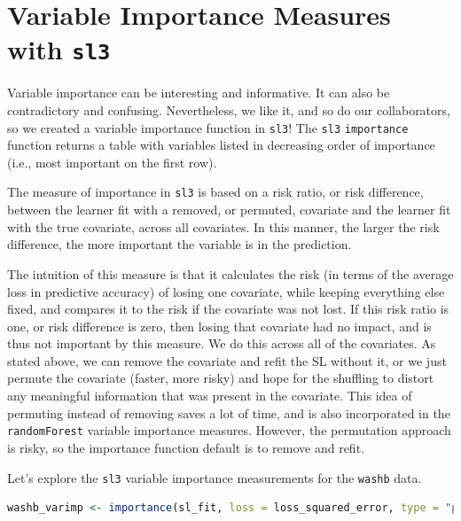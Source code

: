 \documentclass[12pt, krantz2,]{krantz}
\newcommand{\passthrough}[1]{#1}
\theoremstyle{definition}
\theoremstyle{definition}
\theoremstyle{definition}
\newcommand{\1}{\mathbbm{1}}
\begin{document}
\hypertarget{variable-importance-measures-with-sl3}{%
\section{\texorpdfstring{Variable Importance Measures with \texttt{sl3}}{Variable Importance Measures with sl3}}\label{variable-importance-measures-with-sl3}}

Variable importance can be interesting and informative. It can also be
contradictory and confusing. Nevertheless, we like it, and so do our
collaborators, so we created a variable importance function in \passthrough{\lstinline!sl3!}! The \passthrough{\lstinline!sl3!}
\passthrough{\lstinline!importance!} function returns a table with variables listed in decreasing order
of importance (i.e., most important on the first row).

The measure of importance in \passthrough{\lstinline!sl3!} is based on a risk ratio, or risk
difference, between the learner fit with a removed, or permuted, covariate and
the learner fit with the true covariate, across all covariates. In this manner,
the larger the risk difference, the more important the variable is in the
prediction.

The intuition of this measure is that it calculates the risk (in terms of the
average loss in predictive accuracy) of losing one covariate, while keeping
everything else fixed, and compares it to the risk if the covariate was not
lost. If this risk ratio is one, or risk difference is zero, then losing that
covariate had no impact, and is thus not important by this measure. We do this
across all of the covariates. As stated above, we can remove the covariate and
refit the SL without it, or we just permute the covariate (faster, more risky)
and hope for the shuffling to distort any meaningful information that was
present in the covariate. This idea of permuting instead of removing saves a
lot of time, and is also incorporated in the \passthrough{\lstinline!randomForest!} variable importance
measures. However, the permutation approach is risky, so the importance
function default is to remove and refit.

Let's explore the \passthrough{\lstinline!sl3!} variable importance measurements for the \passthrough{\lstinline!washb!} data.

\begin{lstlisting}[language=R]
washb_varimp <- importance(sl_fit, loss = loss_squared_error, type = "permute")
\end{lstlisting}
\end{document}
